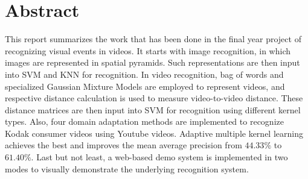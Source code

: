 \section*{Abstract}
This report summarizes the work that has been done in the final year project of recognizing visual events in videos. It starts with image recognition, in which images are represented in spatial pyramids. Such representations are then input into SVM and KNN for recognition. In video recognition, bag of words and specialized Gaussian Mixture Models are employed to represent videos, and respective distance calculation is used to measure video-to-video distance. These distance matrices are then input into SVM for recognition using different kernel types. Also, four domain adaptation methods are implemented to recognize Kodak consumer videos using Youtube videos. Adaptive multiple kernel learning achieves the best and improves the mean average precision from $44.33\%$ to $61.40\%$. Last but not least, a web-based demo system is implemented in two modes to visually demonstrate the underlying recognition system.